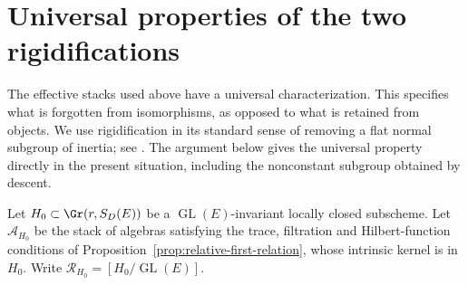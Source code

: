 \documentclass[11pt,reqno]{amsart}
\numberwithin{equation}{section}
\theoremstyle{definition}\newtheorem{definition}[theorem]{Definition}
\theoremstyle{remark}\newtheorem{remark}[theorem]{Remark}
\begin{document}
\section{Universal properties of the two rigidifications}
\label{sec:rigidification-v151}

The effective stacks used above have a universal characterization.
This specifies what is forgotten from isomorphisms, as opposed to what
is retained from objects.  We use rigidification in its standard sense
of removing a flat normal subgroup of inertia; see
\cite[Tag~04V2]{StacksRigidV151}.  The argument below gives the
universal property directly in the present situation, including the
nonconstant subgroup obtained by descent.

Let \(H_0\subset\Gr(r,S_D(E))\) be a
\(\operatorname{GL}(E)\)-invariant locally closed subscheme.  Let
\(\mathscr A_{H_0}\) be the stack of algebras satisfying the trace,
filtration and Hilbert-function conditions of
Proposition~\ref{prop:relative-first-relation}, whose intrinsic
kernel is in \(H_0\).  Write
\(\mathscr R_{H_0}=[H_0/\operatorname{GL}(E)]\).
\end{document}
